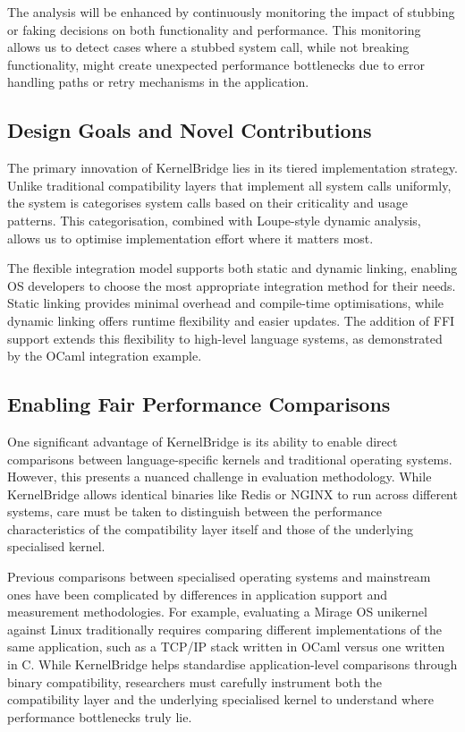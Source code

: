 \documentclass[conference]{IEEEtran}
\begin{document}
The analysis will be enhanced by continuously monitoring the impact of stubbing or faking decisions on both functionality and performance. This monitoring allows us to detect cases where a stubbed system call, while not breaking functionality, might create unexpected performance bottlenecks due to error handling paths or retry mechanisms in the application.

\subsection{Design Goals and Novel Contributions}
The primary innovation of KernelBridge lies in its tiered implementation strategy. Unlike
traditional compatibility layers that implement all system calls uniformly, the system is
categorises system calls based on their criticality and usage patterns. This categorisation,
combined with Loupe-style dynamic analysis, allows us to optimise implementation effort where it matters most.

The flexible integration model supports both static and dynamic linking, enabling OS developers to
choose the most appropriate integration method for their needs. Static linking provides minimal
overhead and compile-time optimisations, while dynamic linking offers runtime flexibility and easier
updates. The addition of FFI support extends this flexibility to high-level language systems, as
demonstrated by the OCaml integration example.

\subsection{Enabling Fair Performance Comparisons}
One significant advantage of KernelBridge is its ability to enable direct comparisons between language-specific kernels and traditional operating systems. However, this presents a nuanced challenge in evaluation methodology. While KernelBridge allows identical binaries like Redis or NGINX to run across different systems, care must be taken to distinguish between the performance characteristics of the compatibility layer itself and those of the underlying specialised kernel.

Previous comparisons between specialised operating systems and mainstream ones have been complicated by differences in application support and measurement methodologies. For example, evaluating a Mirage OS unikernel against Linux traditionally requires comparing different implementations of the same application, such as a TCP/IP stack written in OCaml versus one written in C. While KernelBridge helps standardise application-level comparisons through binary compatibility, researchers must carefully instrument both the compatibility layer and the underlying specialised kernel to understand where performance bottlenecks truly lie.
\end{document}
